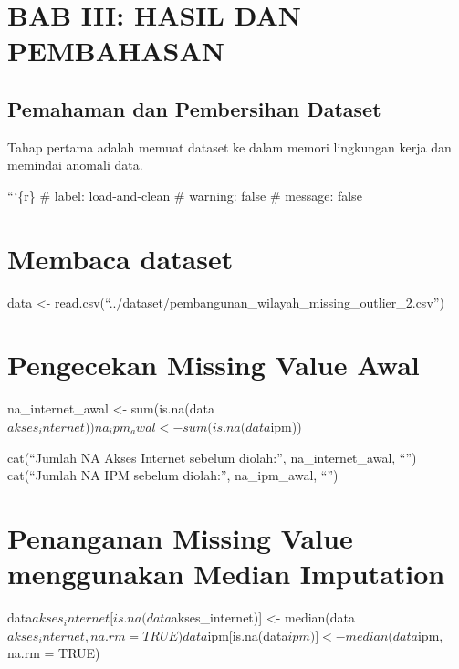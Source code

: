 \documentclass[
  letterpaper,
  DIV=11,
  numbers=noendperiod]{scrartcl}
\begin{document}
\section{BAB III: HASIL DAN
PEMBAHASAN}\label{bab-iii-hasil-dan-pembahasan}

\subsection{Pemahaman dan Pembersihan
Dataset}\label{pemahaman-dan-pembersihan-dataset}

Tahap pertama adalah memuat dataset ke dalam memori lingkungan kerja dan
memindai anomali data.

```\{r\} \#\textbar{} label: load-and-clean \#\textbar{} warning: false
\#\textbar{} message: false

\section{Membaca dataset}\label{membaca-dataset}

data \textless-
read.csv(``../dataset/pembangunan\_wilayah\_missing\_outlier\_2.csv'')

\section{Pengecekan Missing Value
Awal}\label{pengecekan-missing-value-awal}

na\_internet\_awal \textless- sum(is.na(data\(akses_internet))
na_ipm_awal <- sum(is.na(data\)ipm))

cat(``Jumlah NA Akses Internet sebelum diolah:'', na\_internet\_awal,
``\n'') cat(``Jumlah NA IPM sebelum diolah:'', na\_ipm\_awal, ``\n'')

\section{Penanganan Missing Value menggunakan Median
Imputation}\label{penanganan-missing-value-menggunakan-median-imputation}

data\(akses_internet[is.na(data\)akses\_internet){]} \textless-
median(data\(akses_internet, na.rm = TRUE)
data\)ipm{[}is.na(data\(ipm)] <- median(data\)ipm, na.rm = TRUE)
\end{document}
